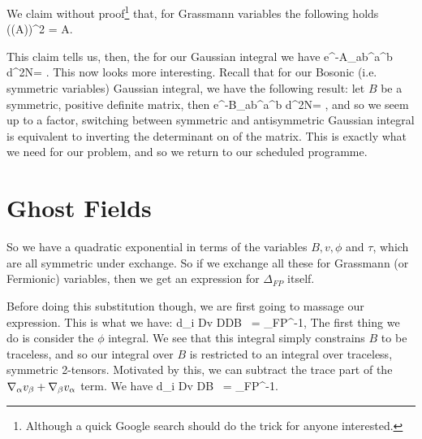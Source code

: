 \bcl 
We claim without proof\footnote{Although a quick Google search should do the trick for anyone interested.} that, for Grassmann variables the following holds 
\bse 
    \big((A)\big)^2 = \det A.
\ese 
\ecl 

This claim tells us, then, the for our Gaussian integral we have 
\bse 
    \int e^{-A_{ab}\psi^a\psi^b} d^{2N}\psi = \pm {}.
\ese 
This now looks more interesting. Recall that for our Bosonic (i.e. symmetric variables) Gaussian integral, we have the following result: let $B$ be a symmetric, positive definite matrix, then 
\bse 
    \int e^{-B_{ab}\phi^a\phi^b} d^{2N}\phi = ,
\ese 
and so we seem up to a factor, switching between symmetric and antisymmetric Gaussian integral is equivalent to inverting the determinant on of the matrix. This is exactly what we need for our problem, and so we return to our scheduled programme. 

\section{Ghost Fields}

So we have a quadratic exponential in terms of the variables $B,v,\phi$ and $\tau$, which are all symmetric under exchange. So if we exchange all these for Grassmann (or Fermionic) variables, then we get an expression for $\Delta_{FP}$ itself.

Before doing this substitution though, we are first going to massage our expression. This is what we have:
\bse 
    \int d\tau_i Dv D\phi DB \, \exp{} = \Delta_{FP}^{-1},
\ese 
The first thing we do is consider the $\phi$ integral. We see that this integral simply constrains $B$ to be traceless, and so our integral over $B$ is restricted to an integral over traceless, symmetric 2-tensors. Motivated by this, we can subtract the trace part of the $\nabla_{\alpha}v_{\beta}+\nabla_{\beta}v_{\alpha}$ term. We have 
\bse 
    \int d\tau_i Dv DB \, \exp{} = \Delta_{FP}^{-1}.
\ese 


